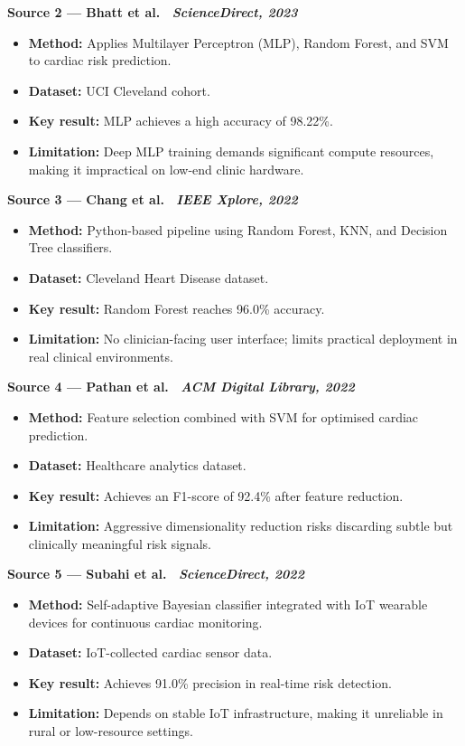 \documentclass[12pt, a4paper]{article}
\begin{document}
\medskip
\noindent\textbf{Source 2 --- Bhatt et al.\ \cite{bhatt2023} \hfill \textit{ScienceDirect, 2023}}
\begin{itemize}
  \item \textbf{Method:} Applies Multilayer Perceptron (MLP), Random Forest, and
        SVM to cardiac risk prediction.
  \item \textbf{Dataset:} UCI Cleveland cohort.
  \item \textbf{Key result:} MLP achieves a high accuracy of 98.22\%.
  \item \textbf{Limitation:} Deep MLP training demands significant compute resources,
        making it impractical on low-end clinic hardware.
\end{itemize}

\medskip
\noindent\textbf{Source 3 --- Chang et al.\ \cite{chang2022} \hfill \textit{IEEE Xplore, 2022}}
\begin{itemize}
  \item \textbf{Method:} Python-based pipeline using Random Forest, KNN, and
        Decision Tree classifiers.
  \item \textbf{Dataset:} Cleveland Heart Disease dataset.
  \item \textbf{Key result:} Random Forest reaches 96.0\% accuracy.
  \item \textbf{Limitation:} No clinician-facing user interface; limits practical
        deployment in real clinical environments.
\end{itemize}

\medskip
\noindent\textbf{Source 4 --- Pathan et al.\ \cite{pathan2022} \hfill \textit{ACM Digital Library, 2022}}
\begin{itemize}
  \item \textbf{Method:} Feature selection combined with SVM for optimised
        cardiac prediction.
  \item \textbf{Dataset:} Healthcare analytics dataset.
  \item \textbf{Key result:} Achieves an F1-score of 92.4\% after feature reduction.
  \item \textbf{Limitation:} Aggressive dimensionality reduction risks discarding
        subtle but clinically meaningful risk signals.
\end{itemize}

\medskip
\noindent\textbf{Source 5 --- Subahi et al.\ \cite{subahi2022} \hfill \textit{ScienceDirect, 2022}}
\begin{itemize}
  \item \textbf{Method:} Self-adaptive Bayesian classifier integrated with IoT
        wearable devices for continuous cardiac monitoring.
  \item \textbf{Dataset:} IoT-collected cardiac sensor data.
  \item \textbf{Key result:} Achieves 91.0\% precision in real-time risk detection.
  \item \textbf{Limitation:} Depends on stable IoT infrastructure, making it
        unreliable in rural or low-resource settings.
\end{itemize}
\end{document}
